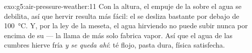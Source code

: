\begin{solution}{exo:g5:air-pressure-weather:11}
Con la altura, el empuje de la  sobre el agua se
debilita, así que hervir resulta más fácil: el 
se desliza bastante por debajo de \qty{100}{\celsius}. Y, por la ley
de la meseta, el agua hirviendo no puede subir nunca por encima de su
 --- la llama de más solo fabrica vapor. Así que
el agua de las cumbres hierve fría \emph{y se queda ahí}: té flojo,
pasta dura, física satisfecha.
\end{solution}
